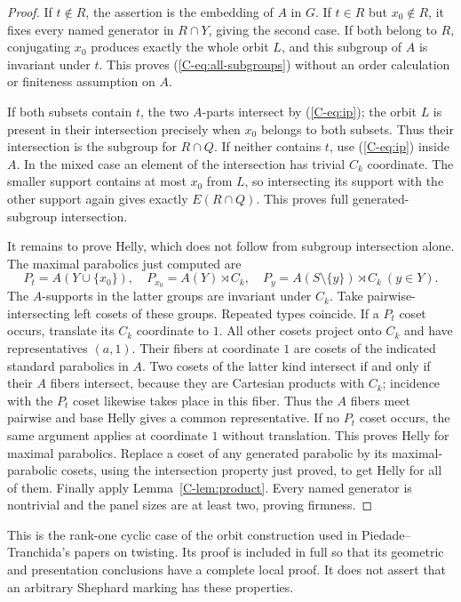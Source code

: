 \begin{proof}
If $t\notin R$, the assertion is the embedding of $A$ in $G$.
If $t\in R$ but $x_0\notin R$, it fixes every named generator in
$R\cap Y$, giving the second case. If both belong to $R$, conjugating
$x_0$ produces exactly the whole orbit $L$, and this subgroup of $A$
is invariant under $t$. This proves (\ref{C-eq:all-subgroups}) without
an order calculation or finiteness assumption on $A$.

If both subsets contain $t$, the two $A$-parts intersect by
(\ref{C-eq:ip}); the orbit $L$ is present in their intersection precisely
when $x_0$ belongs to both subsets. Thus their intersection is the
subgroup for $R\cap Q$. If neither contains $t$, use (\ref{C-eq:ip})
inside $A$. In the mixed case an element of the intersection has trivial
$C_k$ coordinate. The smaller support contains at most $x_0$ from $L$,
so intersecting its support with the other support again gives exactly
$E(R\cap Q)$. This proves full generated-subgroup intersection.

It remains to prove Helly, which does not follow from subgroup
intersection alone. The maximal parabolics just computed are
\begin{equation}\label{C-eq:maximal}
 P_t=A(Y\cup\{x_0\}),\quad
 P_{x_0}=A(Y)\rtimes C_k,\quad
 P_y=A(S\setminus\{y\})\rtimes C_k\ (y\in Y).
\end{equation}
The $A$-supports in the latter groups are invariant under $C_k$.
Take pairwise-intersecting left cosets of these groups. Repeated types
coincide. If a $P_t$ coset occurs, translate its $C_k$ coordinate to
$1$. All other cosets project onto $C_k$ and have representatives
$(a,1)$. Their fibers at coordinate $1$ are cosets of the indicated
standard parabolics in $A$. Two cosets of the latter kind intersect
if and only if their $A$ fibers intersect, because they are Cartesian
products with $C_k$; incidence with the $P_t$ coset likewise takes
place in this fiber. Thus the $A$ fibers meet pairwise and base Helly
gives a common representative. If no $P_t$ coset occurs, the same
argument applies at coordinate $1$ without translation. This proves
Helly for maximal parabolics. Replace a coset of any generated
parabolic by its maximal-parabolic cosets, using the intersection
property just proved, to get Helly for all of them. Finally apply
Lemma~\ref{C-lem:product}. Every named generator is nontrivial and the
panel sizes are at least two, proving firmness.
\end{proof}
This is the rank-one cyclic case of the orbit construction used in
Piedade--Tranchida's papers on twisting. Its proof is included in full
so that its geometric and presentation conclusions have a complete local proof. It does not assert that an arbitrary Shephard marking has
these properties.

